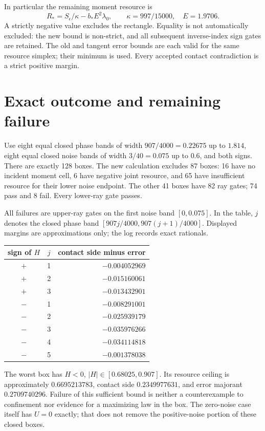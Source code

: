 \documentclass[11pt]{article}
\begin{document}
In particular the remaining moment resource is
\[
 R_*=S_\epsilon/\kappa-b_*E^2\lambda_0,\qquad
 \kappa=997/15000,\quad E=1.9706.
\]
A strictly negative value excludes the rectangle. Equality is not
automatically excluded: the new bound is non-strict, and all subsequent
inverse-index sign gates are retained. The old and tangent error bounds
are each valid for the same resource simplex; their minimum is used.
Every accepted contact contradiction is a strict positive margin.

\section{Exact outcome and remaining failure}
Use eight equal closed phase bands of width $907/4000=0.22675$ up to
$1.814$, eight equal closed noise bands of width $3/40=0.075$ up to
$0.6$, and both signs. There are exactly 128 boxes.
The new calculation excludes 87 boxes: 16 have no incident moment cell,
6 have negative joint resource, and 65 have insufficient resource for
their lower noise endpoint. The other 41 boxes have 82 ray gates;
74 pass and 8 fail. Every lower-ray gate passes.

All failures are upper-ray gates on the first noise band $[0,0.075]$.
In the table, $j$ denotes the closed phase band
$[907j/4000,907(j+1)/4000]$. Displayed margins are approximations only;
the log records exact rationals.
\begin{center}
\begin{tabular}{ccr}\toprule
sign of $H$&$j$&contact side minus error\\\midrule
$+$&1&$-0.004052969$\\
$+$&2&$-0.015160061$\\
$+$&3&$-0.013432901$\\
$-$&1&$-0.008291001$\\
$-$&2&$-0.025939179$\\
$-$&3&$-0.035976266$\\
$-$&4&$-0.034114818$\\
$-$&5&$-0.001378038$\\\bottomrule
\end{tabular}
\end{center}
The worst box has $H<0$, $|H|\in[0.68025,0.907]$. Its resource ceiling
is approximately $0.6695213783$, contact side $0.2349977631$, and error
majorant $0.2709740296$. Failure of this sufficient bound is neither a
counterexample to confinement nor evidence for a maximizing law in the box.
The zero-noise case itself has $U=0$ exactly; that does not remove the
positive-noise portion of these closed boxes.
\end{document}

